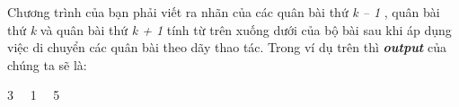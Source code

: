 Chương trình của bạn phải viết ra nhãn của các quân bài thứ \emph{ k – 1 } , quân bài thứ \emph{ k } và quân bài thứ \emph{ k + 1 } tính từ trên xuống dưới của bộ bài sau khi áp dụng việc di chuyển các quân bài theo dãy thao tác. Trong ví dụ trên thì \textbf{\emph{ output }} của chúng ta sẽ là:

3   1   5